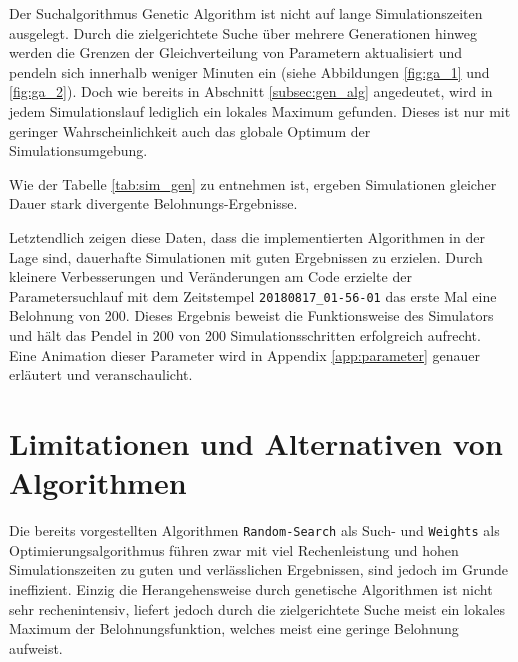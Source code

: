 	Der Suchalgorithmus Genetic Algorithm ist nicht auf lange Simulationszeiten ausgelegt. Durch die zielgerichtete Suche über mehrere Generationen hinweg werden die Grenzen der Gleichverteilung von Parametern aktualisiert und pendeln sich innerhalb weniger Minuten ein (siehe Abbildungen \ref{fig:ga_1} und \ref{fig:ga_2}). Doch wie bereits in Abschnitt \ref{subsec:gen_alg} angedeutet, wird in jedem Simulationslauf lediglich ein lokales Maximum gefunden. Dieses ist nur mit geringer Wahrscheinlichkeit auch das globale Optimum der Simulationsumgebung.
	\begin{table}[H]
		\centering
		\caption{Parametersuche durch Algorithmus \texttt{Genetic\_Algorithm}.}
		\label{tab:sim_gen}
	\end{table}
	Wie der Tabelle \ref{tab:sim_gen} zu entnehmen ist, ergeben Simulationen gleicher Dauer stark divergente Belohnungs-Ergebnisse.
	
	Letztendlich zeigen diese Daten, dass die implementierten Algorithmen in der Lage sind, dauerhafte Simulationen mit guten Ergebnissen zu erzielen. Durch kleinere Verbesserungen und Veränderungen am Code erzielte der Parametersuchlauf mit dem Zeitstempel \texttt{20180817\_01-56-01} das erste Mal eine Belohnung von 200. Dieses Ergebnis beweist die Funktionsweise des Simulators und hält das Pendel in 200 von 200 Simulationsschritten erfolgreich aufrecht. Eine Animation dieser Parameter wird in Appendix \ref{app:parameter} genauer erläutert und veranschaulicht.
	
\section{Limitationen und Alternativen von Algorithmen}
\label{sec:erg_lim}
	Die bereits vorgestellten Algorithmen \texttt{Random-Search} als Such- und \texttt{Weights} als Optimierungsalgorithmus führen zwar mit viel Rechenleistung und hohen Simulationszeiten zu guten und verlässlichen Ergebnissen, sind jedoch im Grunde ineffizient. Einzig die Herangehensweise durch genetische Algorithmen ist nicht sehr rechenintensiv, liefert jedoch durch die zielgerichtete Suche meist ein lokales Maximum der Belohnungsfunktion, welches meist eine geringe Belohnung aufweist.\\
